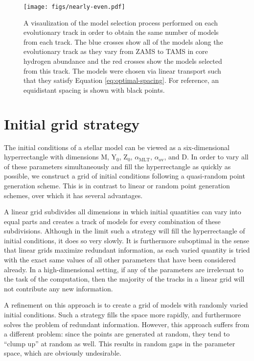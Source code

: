 \documentclass[twocolumn,twocolappendix]{aastex6}
\newif\ifref
\newcommand{\mb}[1]{\ifref\boldmath\textbf{#1}\unboldmath\else #1\fi}
\begin{document}
\begin{figure*}
    \centering
    \texttt{[image: figs/nearly-even.pdf]}
    \caption{ A visaulization of the model selection process performed on each evolutionary track in order to obtain the same number of models from each track. The blue crosses show all of the models along the evolutionary track as they vary from ZAMS to TAMS in core hydrogen abundance and the red crosses show the models selected from this track. The models were chosen via linear transport such that they satisfy Equation \ref{eq:optimal-spacing}. For reference, an equidistant spacing is shown with black points. \vspace*{5mm}
    \label{fig:nearly-even} }%
\end{figure*}



\section{Initial grid strategy}
\label{sec:grid}
The initial conditions of a stellar model can be viewed as a \mb{six-dimensional hyperrectangle} with dimensions M, Y$_0$, Z$_0$, $\alpha_{\text{MLT}}$, $\alpha_{\text{ov}}$, and D. In order to vary all of these parameters simultaneously and fill the \mb{hyperrectangle} as quickly as possible, we construct a grid of initial conditions following a quasi-random point generation scheme. This is in contrast to linear or random point generation schemes, over which it has several advantages. 

A linear grid subdivides all dimensions in which initial quantities can vary into equal parts and creates a track of models for every combination of these subdivisions. Although in the limit such a strategy will fill the \mb{hyperrectangle} of initial conditions, it does so very slowly. It is furthermore suboptimal in the sense that linear grids maximize redundant information, as each varied quantity is tried with the exact same values of all other parameters that have been considered already. In a high-dimensional setting, if any of the parameters are irrelevant to the task of the computation, then the majority of the tracks in a linear grid will not contribute any new information.

A refinement on this approach is to create a grid of models with randomly varied initial conditions. Such a strategy fills the space more rapidly, and furthermore solves the problem of redundant information. However, this approach suffers from a different problem: since the points are generated at random, they tend to ``clump up'' at random as well. This results in random gaps in the parameter space, which are obviously undesirable. 
\end{document}
